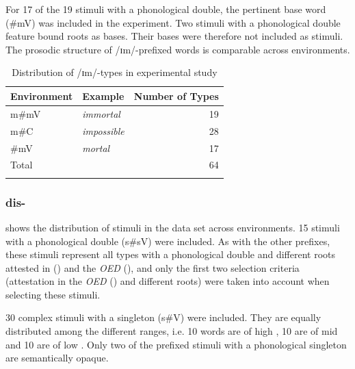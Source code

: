 For 17 of the 19 stimuli with a phonological double, the pertinent base word ({\#mV}) was included in the experiment. Two stimuli with a phonological double feature bound roots as bases. Their bases were therefore not included as stimuli. The prosodic structure of /ɪm/-prefixed words is comparable across environments.



\begin{table}

	\caption{Distribution of /ɪm/-types in experimental study}
	\label{tbl:distribution of im types in experiment}

	
		\begin{tabular} {llr}
\lsptoprule

Environment &Example &Number of   Types\\

 \midrule
 m\#mV&\color{lsMidBlue}\textit{immortal} & 19  \\
  m\#C&\color{lsMidBlue}\textit{impossible} & 28 \\
  \#mV&\color{lsMidBlue}\textit{mortal} & 17 \\
 \midrule
 Total& & 64\\
 \lspbottomrule                                                                                
		\end{tabular}
	
\end{table}



\subsubsection{dis-} \label{dis stimui}

 shows the distribution of  stimuli in the data set across environments. 
15  stimuli with a phonological double (s\#sV) were included. As with the other prefixes, these stimuli represent all types with a phonological double and different roots attested in  (\citealt{Davies.20082014}) and the \textit{OED} (\citealt{OED.2013}),  and only the first two selection criteria (attestation in the \textit{OED} (\citealt{OED.2013}) and different roots) were taken into account when selecting these stimuli. 

30 complex stimuli with a singleton (s\#V) were included. They are equally distributed among the different  ranges, i.e. 10 words are of high , 10 are of mid  and 10 are of low . 
Only two of the prefixed stimuli with a phonological singleton are semantically opaque. 


